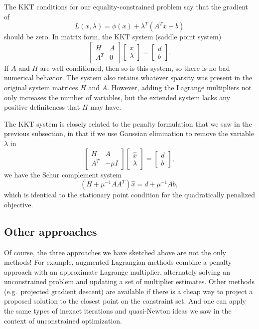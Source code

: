 \documentclass[12pt, leqno]{article} %
\begin{document}
The KKT conditions for our equality-constrained problem say that the
gradient of
\[
  L(x,\lambda) = \phi(x) + \lambda^T (A^T x-b)
\]
should be zero.  In matrix form, the KKT system (saddle point system)
\[
  \begin{bmatrix}
    H & A \\
    A^T & 0
  \end{bmatrix}
  \begin{bmatrix} x \\ \lambda \end{bmatrix} =
  \begin{bmatrix} d \\ b \end{bmatrix}.
\]
If $A$ and $H$ are well-conditioned, then so is this system,
so there is no bad numerical behavior.  The system also retains
whatever sparsity was present in the original system matrices
$H$ and $A$.  However, adding the Lagrange multipliers not only
increases the number of variables, but the extended system lacks
any positive definiteness that $H$ may have.

The KKT system is closely related to the penalty formulation that
we saw in the previous subsection, in that if we use Gaussian
elimination to remove the variable $\lambda$ in
\[
  \begin{bmatrix}
    H & A \\
    A^T & -\mu I
  \end{bmatrix}
  \begin{bmatrix} \hat{x} \\ \lambda \end{bmatrix} =
  \begin{bmatrix} d \\ b \end{bmatrix},
\]
we have the Schur complement system
\[
  (H+\mu^{-1} AA^T) \hat{x} = d + \mu^{-1} A b,
\]
which is identical to the stationary point condition for the
quadratically penalized objective.

\subsection*{Other approaches}

Of course, the three approaches we have sketched above are not the
only methods!  For example, augmented Lagrangian methods combine a
penalty approach with an approximate Lagrange multiplier, alternately
solving an unconstrained problem and updating a set of multiplier
estimates.  Other methods (e.g.~projected gradient descent) are
available if there is a cheap way to project a proposed solution to
the closest point on the constraint set.  And one can apply the same
types of inexact iterations and quasi-Newton ideas we saw in the
context of unconstrained optimization.
\end{document}
